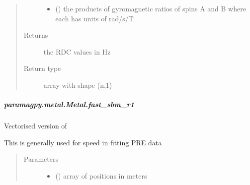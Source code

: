 \documentclass[a4paper,10pt,english,openany,oneside]{sphinxmanual}
\begin{document}
\begin{fulllineitems}
\begin{fulllineitems}
\begin{fulllineitems}
\begin{quote}
\begin{description}
\begin{itemize}
\item {} 
 (\sphinxstyleliteralemphasis{\sphinxupquote{ (}}\sphinxstyleliteralemphasis{\sphinxupquote{,}}\sphinxstyleliteralemphasis{\sphinxupquote{)}}) \textendash{} the products of gyromagnetic ratios of spins A and B
where each has units of rad/s/T

\end{itemize}

\item[{Returns}] \leavevmode
{} \textendash{} the RDC values in Hz

\item[{Return type}] \leavevmode
array with shape (n,1)

\end{description}\end{quote}

\end{fulllineitems}



\subparagraph{paramagpy.metal.Metal.fast\_sbm\_r1}
\label{\detokenize{reference/generated/paramagpy.metal.Metal.fast_sbm_r1:paramagpy-metal-metal-fast-sbm-r1}}\label{\detokenize{reference/generated/paramagpy.metal.Metal.fast_sbm_r1::doc}}

\begin{fulllineitems}
\label{\detokenize{reference/generated/paramagpy.metal.Metal.fast_sbm_r1:paramagpy.metal.Metal.fast_sbm_r1}}
Vectorised version of {\hyperref[\detokenize{reference/generated/paramagpy.metal.Metal.sbm_r1:paramagpy.metal.Metal.sbm_r1}]{}}

This is generally used for speed in fitting PRE data
\begin{quote}\begin{description}
\item[{Parameters}] \leavevmode\begin{itemize}
\item {} 
 (\sphinxstyleliteralemphasis{\sphinxupquote{ (}}\sphinxstyleliteralemphasis{\sphinxupquote{,}}\sphinxstyleliteralemphasis{\sphinxupquote{)}}) \textendash{} array of positions in meters


\end{itemize}
\end{description}
\end{quote}
\end{fulllineitems}
\end{fulllineitems}
\end{fulllineitems}
\end{document}

